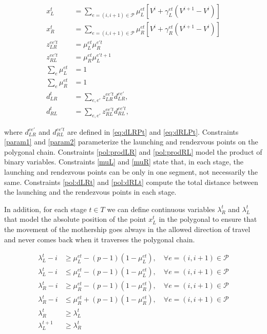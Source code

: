 \begin{align}
    x_L^t & = \sum_{e=(i, i+1)\in\mathcal P} \mu_{L}^{et}\left[V^i + \gamma_L^{et}(V^{i+1} - V^i)\right]\label{param1}\\
    x_R^t & = \sum_{e=(i, i+1)\in\mathcal P} \mu_{R}^{et}\left[ V^i + \gamma_R^{et}(V^{i+1} - V^i)\right]\label{param2}\\
    z_{LR}^{ee't} & = \mu_{L}^{et}\mu_{R}^{e't}\label{pol:prodLR}\\
    z_{RL}^{ee't} & = \mu_{R}^{et}\mu_{L}^{e't+1}\label{pol:prodRL}\\
    \sum_{e} \mu_{L}^{et} & = 1  \label{muL} \\
    \sum_{e} \mu_{R}^{et} & = 1 \label{muR}\\
    d_{LR}^t & = \sum_{e, e'} z_{LR}^{ee't} d_{LR}^{ee'} \label{pol:dLRt},\\
    d_{RL}^t & = \sum_{e, e'} z_{RL}^{ee't} d_{RL}^{ee't} \label{pol:dRLt},
\end{align}

\noindent where $d_{LR}^{ee'}$ and $d_{RL}^{ee't}$ are defined in \eqref{eq:dLRPt} and \eqref{eq:dRLPt}. Constraints \eqref{param1} and \eqref{param2} parameterize the launching and rendezvous points on the polygonal chain. Constraints \eqref{pol:prodLR} and \eqref{pol:prodRL} model the product of binary variables. Constraints \eqref{muL} and \eqref{muR} state that, in each stage, the launching and rendezvous points can be only in one segment, not necessarily the same. Constraints \eqref{pol:dLRt} and \eqref{pol:dRLt} compute the total distance between the launching and the rendezvous points in each stage.

\noindent
In addition, for each stage $t\in T$ we can define continuous variables $\lambda_R^t$ and $\lambda_L^t$ that model the absolute position of the point $x_L^t$ in the polygonal to ensure that the movement of the mothership goes always in the allowed direction of travel and never comes back when it traverses the polygonal chain.

\begin{align}
\lambda_L^t - i & \geq \mu_{L}^{et} - (p-1)(1-\mu_{L}^{et}), \quad \forall e=(i, i+1)\in\mathcal P \label{lambdaLg}\\
\lambda_L^t - i & \leq \mu_{L}^{et} - (p-1)(1-\mu_{L}^{et}), \quad \forall e=(i, i+1)\in\mathcal P \label{lambdaLl}\\
\lambda_R^t - i & \geq \mu_{R}^{et} - (p-1)(1-\mu_{R}^{et}), \quad \forall e=(i, i+1)\in\mathcal P \label{lambdaRg}\\
\lambda_R^t - i & \leq \mu_{R}^{et} + (p-1)(1-\mu_{R}^{et}), \quad \forall e=(i, i+1)\in\mathcal P \label{lambdaRl}\\
\lambda_R^t & \geq \lambda_L^t \label{lambdaRL}\\
\lambda_L^{t+1} & \geq \lambda_R^t \label{lambdaLR}
\end{align}

